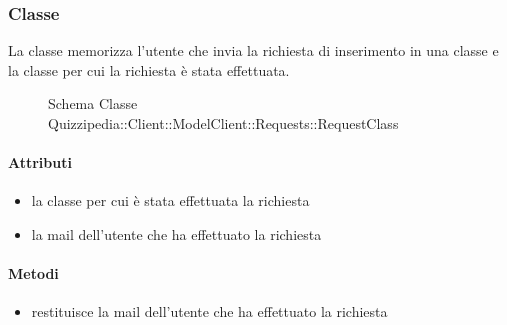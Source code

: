 \subsubsection{Classe }
La classe memorizza l'utente che invia la richiesta di inserimento in una classe e la classe per cui la richiesta è stata effettuata.
\begin{figure}[H]
\centering
\noindent{}
\caption[Schema Classe RequestClass]{Schema Classe Quizzipedia::Client::ModelClient::Requests::RequestClass}
\end{figure}
\paragraph{Attributi}
\begin{itemize}
\item {}
\newline
la classe per cui è stata effettuata la richiesta
\item {}
\newline
la mail dell'utente che ha effettuato la richiesta
\end{itemize}
\paragraph{Metodi}
\begin{itemize}
\item {}
\newline
restituisce la mail dell'utente che ha effettuato la richiesta
\newline
\end{itemize}
